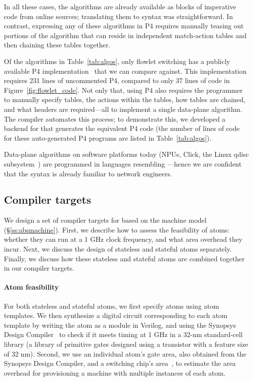 In all these cases, the algorithms are already available as blocks of
imperative code from online sources; translating them to \pktlanguage syntax
was straightforward. In contrast, expressing any of these algorithms in P4
requires manually teasing out portions of the algorithm that can reside in
independent match-action tables and then chaining these tables together.

Of the algorithms in Table~\ref{tab:algos}, only flowlet switching has a
publicly available P4 implementation~\cite{p4_flowlet} that we can compare
against. This implementation requires 231 lines of uncommented P4, compared to
only 37 lines of \pktlanguage code in Figure~\ref{fig:flowlet_code}. Not only
that, using P4 also requires the programmer to manually specify tables, the
actions within the tables, how tables are chained, and what headers are
required---all to implement a single data-plane algorithm. The \pktlanguage
compiler automates this process; to demonstrate this, we developed a backend
for \pktlanguage that generates the equivalent P4 code (the number of lines of
code for these auto-generated P4 programs are listed in Table~\ref{tab:algos}).

Data-plane algorithms on software platforms today (NPUs, Click, the Linux qdisc
subsystem~\cite{qdisc})  are programmed in languages resembling
\pktlanguage---hence we are confident that the \pktlanguage syntax is already
familiar to network engineers.

\subsection{Compiler targets}
\label{ss:targets}

We design a set of compiler targets for \pktlanguage based on the
\absmachine machine model (\S\ref{ss:absmachine}). First, we describe how to
assess the feasibility of atoms: whether they can run at a 1 GHz clock
frequency, and what area overhead they incur. Next, we discuss the
design of stateless and stateful atoms separately. Finally, we discuss how
these stateless and stateful atoms are combined together in our compiler
targets.

\paragraph{Atom feasibility}
For both stateless and stateful atoms, we first specify atoms using atom
templates. We then synthesize a digital circuit corresponding to each atom
template by writing the atom as a module in Verilog, and using the Synopsys
Design Compiler~\cite{synopsys_dc} to check if it meets timing at 1 GHz in a
32-nm standard-cell library (a library of primitive gates designed using a
transistor with a feature size of 32 nm).  Second, we use an individual atom's
gate area, also obtained from the Synopsys Design Compiler, and a switching
chip's area~\cite{gibb_parsing}, to estimate the area overhead for provisioning
a \absmachine machine with multiple instances of each atom.

